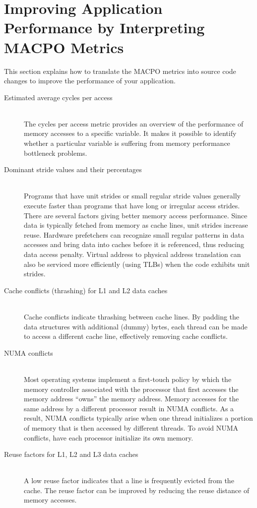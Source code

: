\section{Improving Application Performance by Interpreting MACPO Metrics}

This section explains how to translate the MACPO metrics into source code changes to improve the performance of your application.

\begin{description}
	\item[Estimated average cycles per access]\hfill \\
	The cycles per access metric provides an overview of the performance of memory accesses to a specific variable. It makes it possible to identify whether a particular variable is suffering from memory performance bottleneck problems.

	\item[Dominant stride values and their percentages]\hfill \\
	Programs that have unit strides or small regular stride values generally execute faster than programs that have long or irregular access strides. There are several factors giving better memory access performance. Since data is typically fetched from memory as cache lines, unit strides increase reuse. Hardware prefetchers can recognize small regular patterns in data accesses and bring data into caches before it is referenced, thus reducing data access penalty. Virtual address to physical address translation can also be serviced more efficiently (using TLBs) when the code exhibits unit strides.

	\item[Cache conflicts (thrashing) for L1 and L2 data caches]\hfill \\
	Cache conflicts indicate thrashing between cache lines. By padding the data structures with additional (dummy) bytes, each thread can be made to access a different cache line, effectively removing cache conflicts.

	\item[NUMA conflicts]\hfill \\
	Most operating systems implement a first-touch policy by which the memory controller associated with the processor that first accesses the memory address ``owns'' the memory address. Memory accesses for the same address by a different processor result in NUMA conflicts.  As a result, NUMA conflicts typically arise when one thread initializes a portion of memory that is then accessed by different threads. To avoid NUMA conflicts, have each processor initialize its own memory.

	\item[Reuse factors for L1, L2 and L3 data caches]\hfill \\
	A low reuse factor indicates that a line is frequently evicted from the cache. The reuse factor can be improved by reducing the reuse distance of memory accesses.
\end{description}

